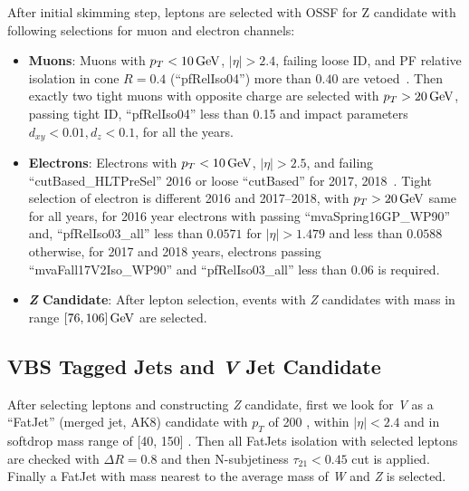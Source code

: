 After initial skimming step, leptons are selected with \gls{OSSF} for Z candidate
with following selections for muon and electron channels:
\begin{itemize}
  \item \textbf{Muons}: Muons with \( p_T < 10 \,\text{Ge\hspace{-.08em}V}{} \), \( |\eta| > 2.4 \),
        failing loose ID, and \gls{PF} relative isolation in cone \( R = 0.4 \) (``pfRelIso04'') more than
        \( 0.40 \) are vetoed~\cite{cms-muon-id}.
        Then exactly two tight muons with opposite charge are selected with \( p_T > 20 \,\text{Ge\hspace{-.08em}V}{} \), passing
        tight ID, ``pfRelIso04'' less than 0.15 and impact parameters \( d_{xy} < 0.01, d_z < 0.1 \),
        for all the years.
  \item \textbf{Electrons}: Electrons with \( p_T < 10 \,\text{Ge\hspace{-.08em}V}{} \), \( |\eta| > 2.5 \),
        and failing ``cutBased\_HLTPreSel'' 2016 or loose ``cutBased'' for 2017, 2018~\cite{cms-egamma-id}.
        Tight selection of electron is different 2016 and 2017--2018,
        with \( p_T > 20 \,\text{Ge\hspace{-.08em}V} \) same for all years, for 2016 year electrons with
        passing ``mvaSpring16GP\_WP90'' and, ``pfRelIso03\_all'' less than \( 0.0571 \) for
        \( |\eta| > 1.479 \) and less than \( 0.0588 \) otherwise,
        for 2017 and 2018 years, electrons passing ``mvaFall17V2Iso\_WP90'' and ``pfRelIso03\_all''
        less than \( 0.06 \) is required.
  \item \textbf{\textit{Z} Candidate}: After lepton selection, events with
        \textit{Z} candidates with mass in range \( [76, 106] \,\text{Ge\hspace{-.08em}V}{} \) are selected.
\end{itemize}

\subsection{
  VBS Tagged Jets and \textit{V} Jet Candidate
}
After selecting leptons and constructing \textit{Z} candidate, first we look
for \textit{V} as a ``FatJet'' (merged jet, AK8) candidate with \( p_T \) of 200 \GeV{},
within \( |\eta| < 2.4 \) and in softdrop mass range of [40, 150] \GeV{}.
Then all FatJets isolation with selected leptons are checked with \( \Delta R = 0.8 \)
and then N-subjetiness \( \tau_{21} < 0.45 \) cut is applied.
Finally a FatJet with mass nearest to the average mass of \textit{W} and \textit{Z}
is selected.


